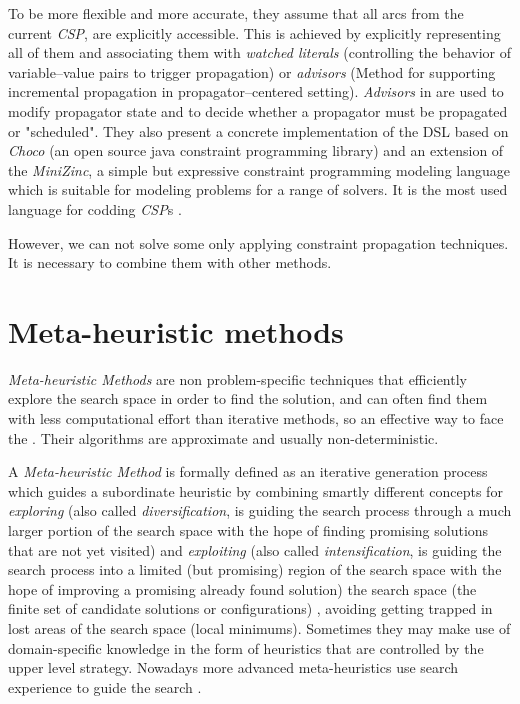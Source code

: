 To be more flexible and more accurate, they assume that all arcs from the current \textit{CSP}, are explicitly accessible. This is achieved by explicitly representing all of them and associating them with {\it watched literals} \cite{Gent2006} (controlling the behavior of variable--value pairs to trigger propagation) or {\it advisors} \cite{Lagerkvist2007} (Method for supporting incremental propagation in propagator--centered setting). {\it Advisors} in \cite{Lagerkvist2007} are used to modify propagator state and to decide whether a propagator must be propagated or "scheduled". They also present a concrete implementation of the DSL based on {\it Choco} \cite{Jussien2008} (an open source java constraint programming library) and an extension of the \textit{MiniZinc}, a simple but expressive constraint programming modeling language which is suitable for modeling problems for a range of solvers. It is the most used language for codding \textit{CSP}s \cite{Nethercote}.

However, we can not solve some \csps{} only applying constraint propagation techniques. It is necessary to combine them with other methods. 

\section{Meta-heuristic methods}
\label{sec:meta}

{\it Meta-heuristic Methods} are non problem-specific techniques that efficiently explore the search space in order to find the solution, and can often find them with less computational effort than iterative methods, so an effective way to face the \csps. Their algorithms are approximate and usually non-deterministic.

A {\it Meta-heuristic Method} is formally defined as an iterative generation process which guides a subordinate heuristic by combining smartly different concepts for \textit{exploring} (also called \textit{diversification}, is guiding the search process through a much larger portion of the search space with the hope of finding promising solutions that are not yet visited) and \textit{exploiting} (also called \textit{intensification}, is guiding the search process into a limited (but promising) region of the search space with the hope of improving a promising already found solution) the search space (the finite set of candidate solutions or configurations) \cite{Osman1996}, avoiding getting trapped in lost areas of the search space (local minimums). Sometimes they may make use of domain-specific knowledge in the form of heuristics that are controlled by the upper level strategy. Nowadays more advanced meta-heuristics use search experience to guide the search \cite{Blum2003}.

